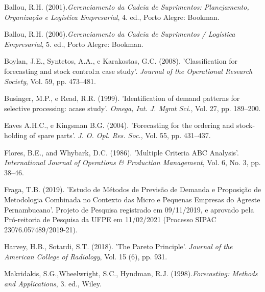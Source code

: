 \documentclass{book}
\begin{document}
\begin{thebibliography}{12}

Ballou, R.H. (2001).{\it Gerenciamento da Cadeia de Suprimentos: Planejamento, Organização e Logística Empresarial}, 4. ed., Porto Alegre: Bookman.

Ballou, R.H. (2006).{\it Gerenciamento da Cadeia de Suprimentos / Logística Empresarial}, 5. ed., Porto Alegre: Bookman.

Boylan, J.E., Syntetos, A.A., e Karakostas, G.C. (2008). 'Classification for forecasting and stock control:a case study'. {\it Journal of the Operational Research Society}, Vol. 59, pp. 473--481.

Businger, M.P., e Read, R.R. (1999). 'Identification of demand patterns for selective processing: acase study'. {\it Omega, Int. J. Mgmt Sci.}, Vol. 27, pp. 189--200.

Eaves A.H.C., e Kingsman B.G. (2004). 'Forecasting for the ordering and stock-holding of spare parts'. {\it J. O. Opl. Res. Soc.}, Vol. 55, pp. 431--437.

Flores, B.E., and Whybark, D.C. (1986). 'Multiple Criteria ABC Analysis'. {\it International Journal of Operations \& Production Management}, Vol. 6, No. 3, pp. 38--46.

Fraga, T.B. (2019). 'Estudo de Métodos de Previsão de Demanda e Proposição de Metodologia Combinada no Contexto das Micro e Pequenas
Empresas do Agreste Pernambucano'. Projeto de Pesquisa registrado em 09/11/2019, e aprovado pela Pró-reitoria de Pesquisa da UFPE em 11/02/2021 (Processo SIPAC 23076.057489/2019-21).

Harvey, H.B., Sotardi, S.T. (2018). 'The Pareto Principle'. {\it Journal of the American College of Radiology}, Vol. 15 (6), pp. 931.
    
Makridakis, S.G.,Wheelwright, S.C., Hyndman, R.J. (1998).{\it Forecasting: Methods and Applications}, 3. ed., Wiley.


\end{thebibliography}
\end{document}

